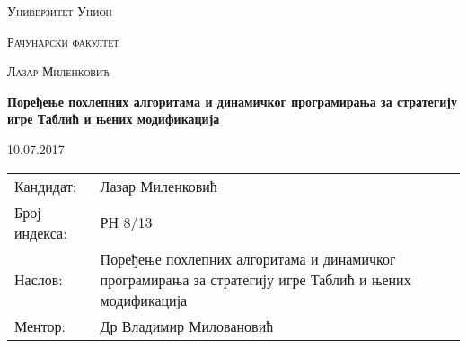 \documentclass[a4paper, 12pt, ngerman]{article}
\begin{document}
\renewcommand{\contentsname}{Садржај}
\renewcommand{\refname}{Литература}
\renewcommand{\abstractname}{Апстракт}
\renewcommand{\figurename}{Слика}
\renewcommand{\appendixtocname}{Додаци}
\renewcommand{\lstlistingname}{Фајл}

\begin{titlepage}
	\centering
	{\scshape\Large Универзитет Унион \par}
	\vspace{1cm}
	{\scshape\LARGE Рачунарски факултет\par}
	\vspace{2cm}
	{\scshape\large Лазар Миленковић\par}
	\vspace{0.5cm}
	{\huge\bfseries Поређење похлепних алгоритама и динамичког програмирања за  стратегију игре Таблић и њених модификација \par}
	\vspace{2cm}
	\vfill

	
	{\large 10.07.2017\par}
\end{titlepage}
\pagebreak

\begin{tabularx}{\textwidth}{lX}
	Кандидат: & Лазар Миленковић  \\
	Број индекса: & РН 8/13 \\
	Наслов: & Поређење похлепних алгоритама и динамичког програмирања за  стратегију игре Таблић и њених модификација \\
	Ментор: & Др Владимир Миловановић\\
\end{tabularx}
\pagebreak
\begin{abstract}
У овом раду пореде се временска, меморијска сложеност, као и ефикасност више похлепних стратегија, као и стратегија динамичког програмирања за игру Таблић и њених модификација. Таблић је популарна игра картама у којој сваки играч наизменично повлачи једну карту са циљем да на крају игре има највећи збир сакупљених карата. У стандардној верзији, играч зна само карте које му се тренутно налазе у руци као и све карте које су прошле до сада. За ову верзију игре имплементирано је неколико похлепних стратегија, као и стратегија динамичког програмирања. Модификована верзија подразумева да играч зна којом стратегијом играју његови противници, као и редослед карата до краја партије. За ову верзију су такође имплементиране похлепна стратегија, динамичка стратегија, као и бектрек стратегија која гарантовано налази најбољи низ потеза. 
\end{abstract}
\end{document}
